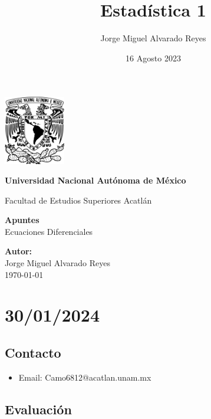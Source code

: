 \documentclass{article}
\title{Estadística 1}
\author{Jorge Miguel Alvarado Reyes}
\date{16 Agosto 2023}
\begin{document}
\begin{titlepage}
    \begin{center}
        \includegraphics[width=0.2\textwidth]{../unam.png}
        \vspace*{.5cm}

        \LARGE
        \textbf{Universidad Nacional Autónoma de México}

        \vspace{0.5cm}
        \LARGE
        Facultad de Estudios Superiores Acatlán

        \vspace{2cm}

        \textbf{Apuntes} \\
        Ecuaciones Diferenciales

        \vfill

        \vspace{1cm}

        \textbf{\large Autor:} \\
        Jorge Miguel Alvarado Reyes \\
        \vspace{.5cm}
        \normalsize \today

    \end{center}
\end{titlepage}
\newpage

\tableofcontents

\newpage

\section{30/01/2024}

\subsection{Contacto}

\begin{itemize}
    \item Email: Camo6812@acatlan.unam.mx
\end{itemize}

\subsection{Evaluación}
\end{document}
